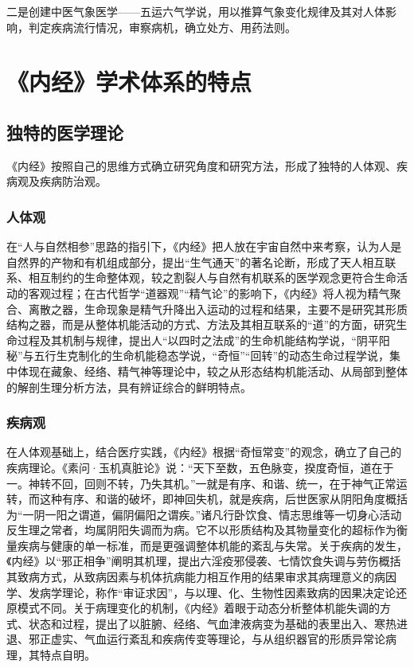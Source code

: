 \documentclass[draft,12pt]{ctexbook}
\begin{document}
二是创建中医气象医学——五运六气学说，用以推算气象变化规律及其对人体影响，判定疾病流行情况，审察病机，确立处方、用药法则。

\section{《内经》学术体系的特点} %

\subsection{独特的医学理论} %

《内经》按照自己的思维方式确立研究角度和研究方法，形成了独特的人体观、疾病观及疾病防治观。

\subsubsection{人体观}%

在“人与自然相参”思路的指引下，《内经》把人放在宇宙自然中来考察，认为人是自然界的产物和有机组成部分，提出“生气通天”的著名论断，形成了天人相互联系、相互制约的生命整体观，较之割裂人与自然有机联系的医学观念更符合生命活动的客观过程；在古代哲学“道器观”“精气论”的影响下，《内经》将人视为精气聚合、离散之器，生命现象是精气升降出入运动的过程和结果，主要不是研究其形质结构之器，而是从整体机能活动的方式、方法及其相互联系的“道”的方面，研究生命过程及其机制与规律，提出人“以四时之法成”的生命机能结构学说，“阴平阳秘”与五行生克制化的生命机能稳态学说，“奇恒”“回转”的动态生命过程学说，集中体现在藏象、经络、精气神等理论中，较之从形态结构机能活动、从局部到整体的解剖生理分析方法，具有辨证综合的鲜明特点。

\subsubsection{疾病观}%

在人体观基础上，结合医疗实践，《内经》根据“奇恒常变”的观念，确立了自己的疾病理论。《素问·玉机真脏论》说：“天下至数，五色脉变，揆度奇恒，道在于一。神转不回，回则不转，乃失其机。”一就是有序、和谐、统一，在于神气正常运转，而这种有序、和谐的破坏，即神回失机，就是疾病，后世医家从阴阳角度概括为“一阴一阳之谓道，偏阴偏阳之谓疾。”诸凡行卧饮食、情志思维等一切身心活动反生理之常者，均属阴阳失调而为病。它不以形质结构及其物量变化的超标作为衡量疾病与健康的单一标准，而是更强调整体机能的紊乱与失常。关于疾病的发生，《内经》以“邪正相争”阐明其机理，提出六淫疫邪侵袭、七情饮食失调与劳伤概括其致病方式，从致病因素与机体抗病能力相互作用的结果审求其病理意义的病因学、发病学理论，称作“审证求因”，与以理、化、生物性因素致病的因果决定论还原模式不同。关于病理变化的机制，《内经》着眼于动态分析整体机能失调的方式、状态和过程，提出了以脏腑、经络、气血津液病变为基础的表里出入、寒热进退、邪正虚实、气血运行紊乱和疾病传变等理论，与从组织器官的形质异常论病理，其特点自明。
\end{document}

